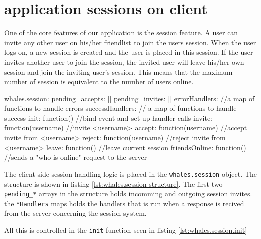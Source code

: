 \section{application sessions on client}

One of the core features of our application is the session feature. A user can
invite any other user on his/her friendlist to join the users session. When the
user logs on, a new session is created and the user is placed in this session.
If the user invites another user to join the session, the invited user will
leave his/her own session and join the inviting user's session. This means that
the maximum number of session is equivalent to the number of users online.

\begin{snippet}[language=JavaScript,label=lst:whales.session structure,caption=The whales.session structure]
whales.session: {
    pending_accepts: []
    pending_invites: []
    errorHandlers: {} //a map of functions to handle errors
    successHandlers: {} // a map of functions to handle success
    init: function() //bind event and set up handler calls
    invite: function(username) //invite <username>
    accept: function(username) //accept invite from <username>
    reject: function(username) //reject invite from <username>
    leave: function() //leave current session
    friendsOnline: function() //sends a "who is online" request to the server
}
\end{snippet}

The client side session handling logic is placed in the
\lstinline$whales.session$ object. The structure is shown in listing \ref{lst:whales.session structure}.
The first two \verb$pending_*$ arrays in the structure holds incomming and
outgoing session invites. the \verb$*Handlers$ maps holds the handlers that is
run when a response is recived from the server concerning the session system.


All this is controlled in the \verb$init$ function seen in listing \ref{lst:whales.session.init}


